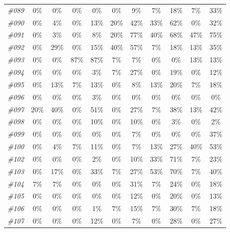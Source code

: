 \begin{table}[t]
\begin{tabular}{ccccccccccc}
    \textit{\#089} & 0\%   & 0\%   & 0\%   & 0\%   & 0\%   & 9\%   & 7\%   & 18\%  & 7\%   & 33\% \\
    \textit{\#090} & 0\%   & 4\%   & 0\%   & 13\%  & 20\%  & 42\%  & 33\%  & 62\%  & 0\%   & 32\% \\
    \textit{\#091} & 0\%   & 3\%   & 0\%   & 8\%   & 20\%  & 77\%  & 40\%  & 68\%  & 47\%  & 75\% \\
    \textit{\#092} & 0\%   & 29\%  & 0\%   & 15\%  & 40\%  & 57\%  & 7\%   & 18\%  & 13\%  & 35\% \\
    \textit{\#093} & 0\%   & 0\%   & 87\%  & 87\%  & 7\%   & 7\%   & 0\%   & 0\%   & 13\%  & 13\% \\
    \textit{\#094} & 0\%   & 0\%   & 0\%   & 3\%   & 7\%   & 27\%  & 0\%   & 19\%  & 0\%   & 12\% \\
    \textit{\#095} & 0\%   & 13\%  & 7\%   & 13\%  & 0\%   & 8\%   & 13\%  & 20\%  & 7\%   & 18\% \\
    \textit{\#096} & 0\%   & 0\%   & 0\%   & 3\%   & 0\%   & 0\%   & 0\%   & 0\%   & 0\%   & 0\% \\
    \textit{\#097} & 20\%  & 40\%  & 0\%   & 51\%  & 0\%   & 27\%  & 7\%   & 38\%  & 13\%  & 42\% \\
    \textit{\#098} & 0\%   & 0\%   & 0\%   & 10\%  & 0\%   & 10\%  & 0\%   & 3\%   & 0\%   & 2\% \\
    \textit{\#099} & 0\%   & 0\%   & 0\%   & 0\%   & 0\%   & 7\%   & 0\%   & 0\%   & 0\%   & 37\% \\
    \textit{\#100} & 0\%   & 4\%   & 7\%   & 11\%  & 0\%   & 7\%   & 13\%  & 27\%  & 40\%  & 53\% \\
    \textit{\#102} & 0\%   & 0\%   & 0\%   & 2\%   & 0\%   & 10\%  & 33\%  & 71\%  & 7\%   & 23\% \\
    \textit{\#103} & 0\%   & 17\%  & 0\%   & 33\%  & 7\%   & 27\%  & 53\%  & 70\%  & 7\%   & 40\% \\
    \textit{\#104} & 7\%   & 7\%   & 0\%   & 0\%   & 0\%   & 31\%  & 7\%   & 24\%  & 0\%   & 18\% \\
    \textit{\#105} & 0\%   & 0\%   & 0\%   & 0\%   & 0\%   & 12\%  & 0\%   & 20\%  & 0\%   & 13\% \\
    \textit{\#106} & 0\%   & 0\%   & 0\%   & 1\%   & 7\%   & 15\%  & 7\%   & 30\%  & 7\%   & 18\% \\
    \textit{\#107} & 0\%   & 0\%   & 0\%   & 12\%  & 0\%   & 7\%   & 0\%   & 28\%  & 0\%   & 27\% \\
    \bottomrule
    \end{tabular}%
  \label{tab:exp_a2d_2}%
\end{table}%




